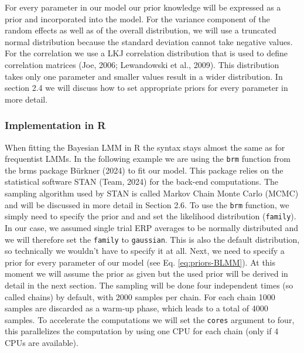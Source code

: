 \documentclass[
  doc,12pt,floatsintext]{apa7}
\begin{document}
For every parameter in our model our prior knowledge will be expressed as a prior and incorporated into the model. For the variance component of the random effects as well as of the overall distribution, we will use a truncated normal distribution because the standard deviation cannot take negative values. For the correlation we use a LKJ correlation distribution that is used to define correlation matrices (Joe, 2006; Lewandowski et al., 2009). This distribution takes only one parameter and smaller values result in a wider distribution. In section 2.4 we will discuss how to set appropriate priors for every parameter in more detail.

\subsubsection{Implementation in R}\label{implementation-in-r}

When fitting the Bayesian LMM in R the syntax stays almost the same as for frequentist LMMs. In the following example we are using the \texttt{brm} function from the brms package Bürkner (2024) to fit our model. This package relies on the statistical software STAN (Team, 2024) for the back-end computations. The sampling algorithm used by STAN is called Markov Chain Monte Carlo (MCMC) and will be discussed in more detail in Section 2.6. To use the \texttt{brm} function, we simply need to specify the prior and and set the likelihood distribution (\texttt{family}). In our case, we assumed single trial ERP averages to be normally distributed and we will therefore set the \texttt{family} to \texttt{gaussian}. This is also the default distribution, so technically we wouldn't have to specify it at all. Next, we need to specify a prior for every parameter of our model (see Eq. \eqref{eq:priors-BLMM}). At this moment we will assume the prior as given but the used prior will be derived in detail in the next section. The sampling will be done four independent times (so called chains) by default, with 2000 samples per chain. For each chain 1000 samples are discarded as a warm-up phase, which leads to a total of 4000 samples. To accelerate the computations we will set the \texttt{cores} argument to four, this parallelizes the computation by using one CPU for each chain (only if 4 CPUs are available).
\end{document}
